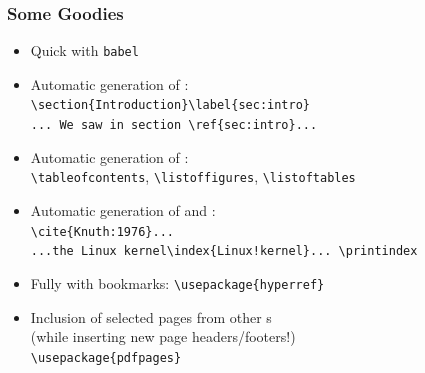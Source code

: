 \begin{frame}[fragile]
\lstset{basicstyle=\ttfamily}
\frametitle{Some Goodies}
\begin{itemize}
\item<+> Quick  with \texttt{babel}
\item<+> Automatic generation of :\\
\lstinline|\section{Introduction}\label{sec:intro}|\\
\lstinline|... We saw in section \ref{sec:intro}...|
\item<+> Automatic generation of :\\
\lstinline[texcs={tableofcontents}]|\tableofcontents|, \lstinline[texcs={listoffigures}]|\listoffigures|,  \lstinline[texcs={listoftables}]|\listoftables|
\item<+> Automatic generation of  and :\\
\lstinline|\cite{Knuth:1976}...|\\
\lstinline[moretexcs={printindex}]|...the Linux kernel\index{Linux!kernel}... \printindex|\\
\item<+> Fully   with bookmarks: \lstinline|\usepackage{hyperref}|
\item<+> Inclusion of selected pages from other s\\(while inserting new page headers/footers!)\\
\lstinline|\usepackage{pdfpages}|\\
\lstinline||
\end{itemize}
\end{frame}


